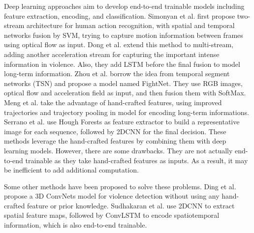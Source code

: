 \documentclass[10pt,twocolumn,letterpaper]{article}
\begin{document}
Deep learning approaches aim to develop end-to-end trainable models including feature extraction, encoding, and classification. 
Simonyan et al. \cite{two-stream} first propose two-stream architecture for human action recognition, with spatial and temporal networks fusion by SVM, trying to capture motion information between frames using optical flow as input.
Dong et al. \cite{dong2016multi} extend this method to multi-stream, adding another acceleration stream for capturing the important intense information in violence. Also, they add LSTM \cite{lstm} before the final fusion to model long-term information.  
Zhou et al. \cite{zhou2017violent} borrow the idea from temporal segment networks (TSN) \cite{tsn} and propose a model named FightNet. They use RGB images, optical flow and acceleration field as input, and then fusion them with SoftMax.
Meng et al. \cite{meng2017trajectory} take the advantage of hand-crafted features, using improved trajectories and trajectory pooling in model for encoding long-term informations.
Serrano et al. \cite{serrano2018fight} use Hough Forests as feature extractor to build a representative image for each sequence, followed by 2DCNN for the final decision.
These methods leverage the hand-crafted features by combining them with deep learning models. However, there are some drawbacks. They are not actually end-to-end trainable as they take hand-crafted features as inputs. As a result, it may be inefficient to add additional computation.

Some other methods have been proposed to solve these problems.
Ding et al. \cite{3dcnn_ding} propose a 3D ConvNets model for violence detection without using any hand-crafted feature or prior knowledge. 
Sudhakaran et al. \cite{convlstm_sudh} use 2DCNN to extract spatial feature maps, followed by ConvLSTM \cite{convlstm} to encode spatiotemporal information, which is also end-to-end trainable.


\end{document}
